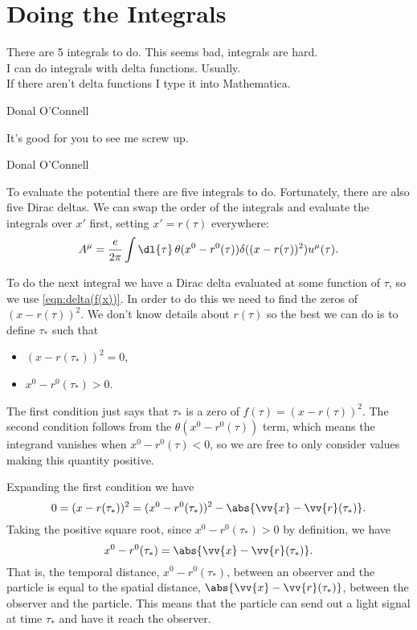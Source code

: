 \documentclass[fleqn]{NotesClass}
\begin{document}
    \section{Doing the Integrals}
    \epigraph{There are 5 integrals to do. This seems bad, integrals are hard.\\ I can do integrals with delta functions. Usually.\\ If there aren't delta functions I type it into Mathematica.}{Donal O'Connell}
    \epigraph{It's good for you to see me screw up.}{Donal O'Connell}
    
    To evaluate the potential there are five integrals to do.
    Fortunately, there are also five Dirac deltas.
    We can swap the order of the integrals and evaluate the integrals over \(x'\) first, setting \(x' = r(\tau)\) everywhere:
    \begin{equation}
        A^\mu = \frac{e}{2\pi} \int \dl{\tau} \, \theta(x^0 - r^0(\tau)) \delta((x - r(\tau))^2) u^\mu(\tau).
    \end{equation}
    
    To do the next integral we have a Dirac delta evaluated at some function of \(\tau\), so we use \cref{eqn:delta(f(x))}.
    In order to do this we need to find the zeros of \((x - r(\tau))^2\).
    We don't know details about \(r(\tau)\) so the best we can do is to define \(\tau_*\) such that
    \begin{itemize}
        \item \((x - r(\tau_*))^2 = 0\),
        \item \(x^0 - r^0(\tau_*) > 0\).
    \end{itemize}
    The first condition just says that \(\tau_*\) is a zero of \(f(\tau) = (x - r(\tau))^2\).
    The second condition follows from the \(\theta(x^0 - r^0(\tau))\) term, which means the integrand vanishes when \(x^0 - r^0(\tau) < 0\), so we are free to only consider values making this quantity positive.
    
    Expanding the first condition we have
    \begin{equation}
        0 = (x - r(\tau_*))^2 = (x^0 - r^0(\tau_*))^2 - \abs{\vv{x} - \vv{r}(\tau_*)}.
    \end{equation}
    Taking the positive square root, since \(x^0 - r^0(\tau_*) > 0\) by definition, we have
    \begin{equation}
        x^0 - r^0(\tau_*) = \abs{\vv{x} - \vv{r}(\tau_*)}.
    \end{equation}
    That is, the temporal distance, \(x^0 - r^0(\tau_*)\), between an observer and the particle is equal to the spatial distance, \(\abs{\vv{x} - \vv{r}(\tau_*)}\), between the observer and the particle.
    This means that the particle can send out a light signal at time \(\tau_*\) and have it reach the observer.
    
\end{document}
